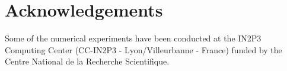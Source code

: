 \documentclass[twocolumn,twocolappendix,nofootinbib,iop]{openjournal}
\newcommand{\FrL}[1]{{\color{cyan}FL: #1}}
\newcommand{\jax}{\texttt{JAX}}
\begin{document}

\section*{Acknowledgements}
Some of the numerical experiments have been conducted at the IN2P3 Computing Center (CC-IN2P3 - Lyon/Villeurbanne - France) funded by the Centre National de la Recherche Scientifique.





% 
 
\typeout{}


\end{document}
